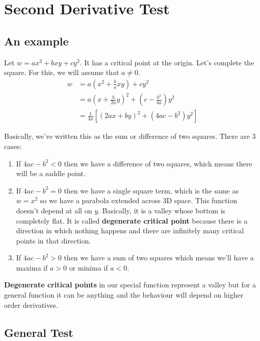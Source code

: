 

\chapter{Second Derivative Test}

\bigbreak
\section{An example}

Let $w = ax^2 + bxy + cy^2$. It has a critical point at the origin.
Let's complete the square. For this, we will assume that $a \neq 0$.
\begin{align*}
    w   & = a \left( x^2 + \frac{b}{a}xy \right)  + cy^2 \\
        & = a \left( x + \frac{b}{2a}y \right)^2  + \left( c - \frac{b^2}{4a} \right) y^2 \\
        & = \frac{1}{4a} \left[ (2ax + by)^2 + (4ac - b^2)y^2 \right]
\end{align*}

Basically, we've written this as the sum or difference of two squares. There are 3 cases:

\begin{enumerate}
    \item If $4ac - b^2 < 0$ then we have a difference of two squares, which means there will be a saddle point.
    \item If $4ac - b^2 = 0$ then we have a single square term, which is the same as $w = x^2$ so we have a parabola extended across 3D space.
    This function doesn't depend at all on $y$. Basically, it is a valley whose bottom is completely flat.
    It is called {\bf degenerate critical point} because there is a direction in which nothing happens and there are infinitely many critical points in that direction.
    \item If $4ac - b^2 > 0$ then we have a sum of two squares which means we'll have a maxima if $a > 0$ or minima if $a < 0$.
\end{enumerate}

{\bf Degenerate critical points } in our special function represent a valley but for a general function it can be anything and the behaviour will depend on higher order derivatives.

\section{General Test}

